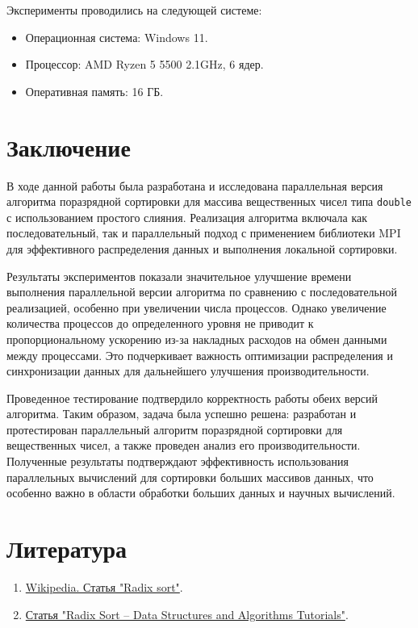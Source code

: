 \documentclass[12pt]{article}
\begin{document}
Эксперименты проводились на следующей системе: \begin{itemize} \item Операционная система: Windows 11. \item Процессор: AMD Ryzen 5 5500 2.1GHz, 6 ядер. \item Оперативная память: 16 ГБ. \end{itemize}

\newpage

\section*{Заключение}

\hspace*{1.25em}В ходе данной работы была разработана и исследована параллельная версия алгоритма поразрядной сортировки для массива вещественных чисел типа \texttt{double} с использованием простого слияния. Реализация алгоритма включала как последовательный, так и параллельный подход с применением библиотеки MPI для эффективного распределения данных и выполнения локальной сортировки.

Результаты экспериментов показали значительное улучшение времени выполнения параллельной версии алгоритма по сравнению с последовательной реализацией, особенно при увеличении числа процессов. Однако увеличение количества процессов до определенного уровня не приводит к пропорциональному ускорению из-за накладных расходов на обмен данными между процессами. Это подчеркивает важность оптимизации распределения и синхронизации данных для дальнейшего улучшения производительности.

Проведенное тестирование подтвердило корректность работы обеих версий алгоритма. Таким образом, задача была успешно решена: разработан и протестирован параллельный алгоритм поразрядной сортировки для вещественных чисел, а также проведен анализ его производительности. Полученные результаты подтверждают эффективность использования параллельных вычислений для сортировки больших массивов данных, что особенно важно в области обработки больших данных и научных вычислений.

\newpage

\section*{Литература}

\begin{enumerate}
    \item \href{https://en.wikipedia.org/wiki/Radix_sort}{Wikipedia. Статья "Radix sort"}.
    \item \href{https://www.geeksforgeeks.org/radix-sort/}{Статья "Radix Sort – Data Structures and Algorithms Tutorials"}.
\end{enumerate}
\end{document}
